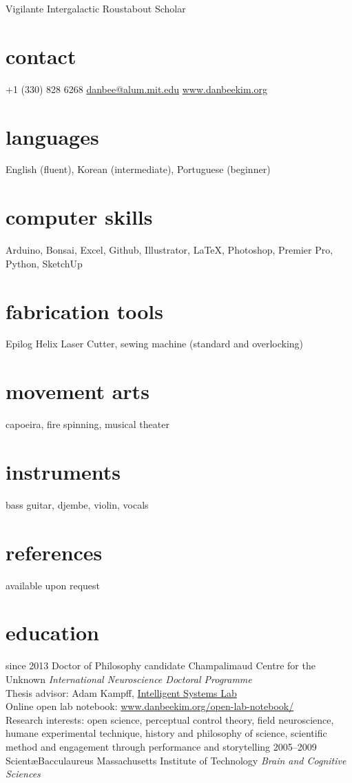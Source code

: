 \documentclass[]{friggeri-cv}
\begin{document}
       {Vigilante Intergalactic Roustabout Scholar}


\begin{aside}
  \section{contact}
    +1 (330) 828 6268
    \href{mailto:danbee@alum.mit.edu}{danbee@alum.mit.edu}
    \href{www.danbeekim.org}{www.danbeekim.org}
  \section{languages}
    English (fluent),
    Korean (intermediate),
    Portuguese (beginner)
  \section{computer skills}
    Arduino, Bonsai, Excel,
    Github, Illustrator, 
    \LaTeX, Photoshop,
    Premier Pro, Python,
    SketchUp
  \section{fabrication tools}
    Epilog Helix Laser Cutter, sewing machine (standard and overlocking)
  \section{movement arts}
    capoeira, fire spinning,
    musical theater
  \section{instruments}
    bass guitar, djembe,
    violin, vocals
  \section{references}
    available upon request        
\end{aside}

\section{education}

\begin{entrylist}
  \entry
    {since 2013}
    {Doctor of Philosophy candidate}
    {Champalimaud Centre for the Unknown}
    {\emph{International Neuroscience Doctoral Programme}\\
    Thesis advisor: Adam Kampff, \href{www.kampff-lab.org}{Intelligent Systems Lab}\\
    Online open lab notebook: \href{http://www.danbeekim.org/open-lab-notebook/}{www.danbeekim.org/open-lab-notebook/}\\
    Research interests: open science, perceptual control theory, field neuroscience, humane experimental technique, history and philosophy of science, scientific method and engagement through performance and storytelling}
  \entry
    {2005–2009}
    {Scient\ae Bacculaureus}
    {Massachusetts Institute of Technology}
    {\emph{Brain and Cognitive Sciences}}
\end{entrylist}
\end{document}
